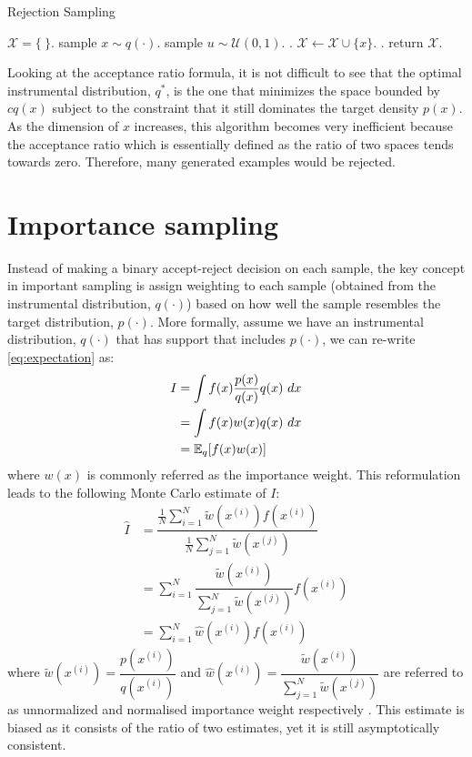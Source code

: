 \begin{algorithm}
\caption{Rejection Sampling}\label{algo:rejectionsampling}
\begin{algorithmic}[1]
\State $\mathcal{X} = \{\ \}$.
\Repeat
  \State sample $x \sim q(\cdot)$.
  \State sample $u \sim \mathcal{U}(0,1)$.
  .
    \State $\mathcal{X} \gets \mathcal{X} \cup \{x\}$.
  \EndIf
{}.
\State return $\mathcal{X}$.
\EndFunction
\end{algorithmic}
\end{algorithm}

Looking at the acceptance ratio formula, it is not difficult to see that the optimal instrumental distribution, $q^*$, is the one that minimizes the space bounded by $cq(x)$ subject to the constraint that it still dominates the target density $p(x)$. As the dimension of $x$ increases, this algorithm becomes very inefficient because the acceptance ratio which is essentially defined as the ratio of two spaces tends towards zero. Therefore, many generated examples would be rejected. 

\section{Importance sampling}
\label{sec:IS}
Instead of making a binary accept-reject decision on each sample, the key concept in important sampling is assign weighting to each sample (obtained from the instrumental distribution, $q(\cdot)$) based on how well the sample resembles the target distribution, $p(\cdot)$. More formally, assume we have an instrumental distribution, $q(\cdot)$ that has support that includes $p(\cdot)$, we can re-write \eqref{eq:expectation} as:
\begin{align}
  I &= \int f(x)\dfrac{p(x)}{q(x)}q(x)~dx \nonumber \\
    &= \int f(x)w(x)q(x)~dx \nonumber \\
    &= \operatorname{\mathbb{E}}_q[f(x)w(x)]
\end{align}
where $w(x)$ is commonly referred as the importance weight. This reformulation leads to the following Monte Carlo estimate of $I$:
\begin{align}
  \hat{I} &= \dfrac{\frac{1}{N} \sum^N_{i=1} \tilde{w}(x^{(i)})f(x^{(i)})}{\frac{1}{N} \sum^N_{j=1} \tilde{w}(x^{(j)})} \nonumber \\ 
          &= \sum^N_{i=1} \dfrac{\tilde{w}(x^{(i)})}{\sum^N_{j=1} \tilde{w}(x^{(j)})} f(x^{(i)}) \nonumber \\
          &= \sum^N_{i=1} \hat{w}(x^{(i)}) f(x^{(i)})  \label{eq:is} 
\end{align}
where $\tilde{w}(x^{(i)}) = \dfrac{p(x^{(i)})}{q(x^{(i)})}$ and $\hat{w}(x^{(i)})  = \dfrac{\tilde{w}(x^{(i)})}{\sum^N_{j=1} \tilde{w}(x^{(j)})}$ are referred to as unnormalized and normalised importance weight respectively \cite{CO05}. This estimate is biased as it consists of the ratio of two estimates, yet it is still asymptotically consistent.


